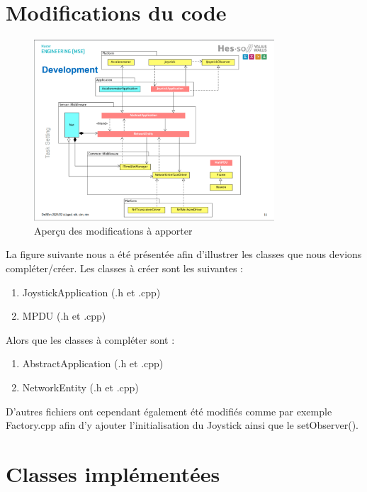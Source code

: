 \documentclass{report}
\begin{document}
\chapter{Modifications du code}
\begin{figure}[H]
    \centering
    \includegraphics[width= 0.8\textwidth]{Images/ClassesToImplement.png}
    \caption{Aperçu des modifications à apporter}
    \label{fig:ClassesToModify}
\end{figure}
La figure suivante nous a été présentée afin d'illustrer les classes que nous devions compléter/créer. Les classes à créer sont les suivantes :
\begin{enumerate}
\item JoystickApplication (.h et .cpp)
\item MPDU (.h et .cpp)
\end{enumerate}
Alors que les classes à compléter sont :
\begin{enumerate}
\item AbstractApplication (.h et .cpp)
\item NetworkEntity (.h et .cpp)
\end{enumerate}
D'autres fichiers ont cependant également été modifiés comme par exemple Factory.cpp afin d'y ajouter l'initialisation du Joystick ainsi que le setObserver().\newline

\chapter{Classes implémentées}
\end{document}
